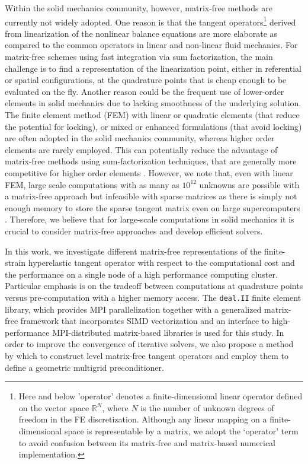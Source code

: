 \documentclass[AMA,STIX1COL]{WileyNJD-v2}
\begin{document}
Within the solid mechanics community, however, matrix-free methods are currently not widely adopted.
One reason is that the tangent operators\footnote{Here and
below 'operator' denotes a finite-dimensional linear operator defined on the vector space $\mathbb R^N$, where $N$ is the number of unknown degrees of freedom in the FE discretization.
Although any linear mapping on a finite-dimensional space is representable by a matrix, we adopt the `operator' term to avoid confusion between its matrix-free and matrix-based numerical implementation.
} derived from linearization of the nonlinear balance equations are
more elaborate as compared to the common operators in linear and non-linear fluid mechanics.
{\color{red}
For matrix-free schemes using fast integration via sum factorization, the main challenge is to find a representation of the linearization point, either in referential or spatial configurations, at the quadrature points that is cheap enough to be evaluated on the fly.
}
Another reason could be the frequent use of lower-order elements in solid mechanics due to lacking smoothness of the underlying solution.
The finite element method (FEM) with linear or quadratic elements (that reduce the potential for locking), or mixed or enhanced formulations (that avoid locking) are often adopted in the solid mechanics community,
whereas higher order elements are rarely employed.
This can potentially reduce the advantage of matrix-free methods using sum-factorization techniques, that are generally more competitive for higher order elements \cite{kronbichler12,kronbichler2017fast,muthing2017high,Fischer2019}.
However, we note that, even with linear FEM, large scale computations with as many as $10^{12}$ unknowns are possible with a matrix-free approach but infeasible with sparse matrices as there is simply not enough memory to store the sparse tangent matrix even on large supercomputers \cite{Gmeiner2016}. Therefore, we believe that for large-scale computations in solid mechanics it is crucial to consider matrix-free approaches and develop efficient solvers.

{\color{red}
In this work, we investigate different matrix-free representations of the
finite-strain hyperelastic tangent operator with respect to the computational cost
and the performance on a single node of a high performance computing cluster.
Particular emphasis is on the tradeoff between computations at quadrature points versus
pre-computation with a higher memory access.
The \texttt{deal.II} \cite{dealII90} finite element library, which provides MPI parallelization together with a generalized matrix-free framework that incorporates SIMD vectorization and an interface to high-performance MPI-distributed matrix-based libraries is used for this study.
In order to improve the convergence of iterative solvers, we also propose a method by which to construct level matrix-free tangent operators
and employ them to define a \mbox{geometric} multigrid preconditioner.
}
\end{document}
